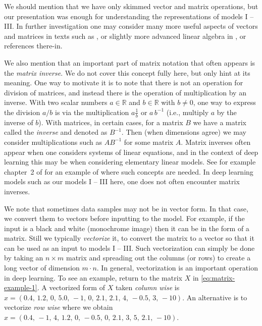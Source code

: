 We should mention that we have only skimmed vector and matrix operations, but our presentation was enough for understanding the representations of models I -- III. In further investigation one may consider many more useful aspects of vectors and matrices in texts such as \cite{boyd2018introduction}, or slightly more advanced linear algebra in \cite{strang2019linear}, or references there-in. 

We also mention that an important part of matrix notation that often appears is the {\em matrix inverse}. We do not cover this concept fully here, but only hint at its meaning. One way to motivate it is to note that there is not an operation for division of matrices, and instead there is the operation of multiplication by an inverse. With two scalar numbers $a \in {\mathbb R}$ and $b \in {\mathbb R}$ with $b \neq 0$, one way to express the division $a/b$ is via the multiplication $a \frac{1}{b}$ or $a \,b^{-1}$ (i.e., multiply $a$ by the inverse of $b$). With matrices, in certain cases, for a matrix $B$ we have a matrix called the {\em inverse} and denoted as $B^{-1}$. Then (when dimensions agree) we may consider multiplications such as $A B^{-1}$ for some matrix $A$. Matrix inverses often appear when one considers systems of linear equations, and in the context of deep learning this may be when considering elementary linear models. See for example chapter~2 of  \cite{LiquetMokaNazarathy2024DeepLearning} for an example of where such concepts are needed. In deep learning models such as our models I -- III here, one does not often encounter matrix inverses.

We note that sometimes data samples may not be in vector form. In that case, we convert them to vectors before inputting to the model. For example, if the input is a black and white (monochrome image) then it can be in the form of a matrix. Still we typically {\em vectorize} it, to convert the matrix to a vector so that it can be used as an input to models I -- III. Such vectorization can simply be done by taking an $n \times m$ matrix and spreading out the columns (or rows) to create a long vector of dimension $m \cdot n$. In general, vectorization is an important operation in deep learning. To see an example, return to the matrix $X$ in \eqref{eq:matrix-example-1}. A vectorized form of $X$ taken {\em column wise} is $x = (0.4,\, 1.2,\, 0,\, 5.0,\, -1,\, 0,\, 2.1,\, 2.1,\, 4,\, -0.5,\, 3,\, -10)$. An alternative is to vectorize {\em row wise} where we obtain $x = (0.4,\, -1,\, 4,\, 1.2,\, 0,\, -0.5,\, 0,\, 2.1,\, 3,\, 5,\, 2.1,\, -10)$.

